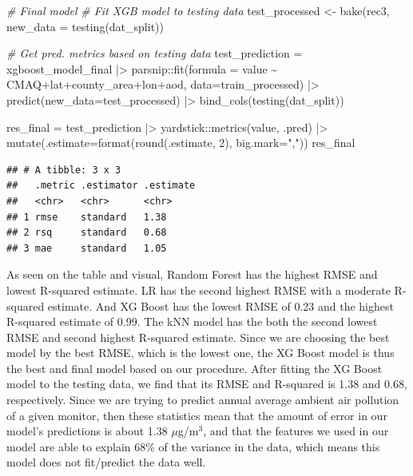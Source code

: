 \documentclass[
]{article}
\newenvironment{Shaded}{\begin{snugshade}}{\end{snugshade}}
\newcommand{\AttributeTok}[1]{\textcolor[rgb]{0.77,0.63,0.00}{#1}}
\newcommand{\CommentTok}[1]{\textcolor[rgb]{0.56,0.35,0.01}{\textit{#1}}}
\newcommand{\DecValTok}[1]{\textcolor[rgb]{0.00,0.00,0.81}{#1}}
\newcommand{\FunctionTok}[1]{\textcolor[rgb]{0.00,0.00,0.00}{#1}}
\newcommand{\NormalTok}[1]{#1}
\newcommand{\OtherTok}[1]{\textcolor[rgb]{0.56,0.35,0.01}{#1}}
\newcommand{\SpecialCharTok}[1]{\textcolor[rgb]{0.00,0.00,0.00}{#1}}
\newcommand{\StringTok}[1]{\textcolor[rgb]{0.31,0.60,0.02}{#1}}
\begin{document}
\begin{Shaded}
\begin{Highlighting}[]
\CommentTok{\# Final model}
\CommentTok{\# Fit XGB model to testing data}
\NormalTok{test\_processed }\OtherTok{\textless{}{-}} \FunctionTok{bake}\NormalTok{(rec3, }\AttributeTok{new\_data =} \FunctionTok{testing}\NormalTok{(dat\_split))}

\CommentTok{\# Get pred. metrics based on testing data}
\NormalTok{test\_prediction }\OtherTok{=}\NormalTok{ xgboost\_model\_final }\SpecialCharTok{|\textgreater{}} 
\NormalTok{  parsnip}\SpecialCharTok{::}\FunctionTok{fit}\NormalTok{(}\AttributeTok{formula =}\NormalTok{ value }\SpecialCharTok{\textasciitilde{}}\NormalTok{ CMAQ}\SpecialCharTok{+}\NormalTok{lat}\SpecialCharTok{+}\NormalTok{county\_area}\SpecialCharTok{+}\NormalTok{lon}\SpecialCharTok{+}\NormalTok{aod, }\AttributeTok{data=}\NormalTok{train\_processed) }\SpecialCharTok{|\textgreater{}} 
  \FunctionTok{predict}\NormalTok{(}\AttributeTok{new\_data=}\NormalTok{test\_processed) }\SpecialCharTok{|\textgreater{}} 
  \FunctionTok{bind\_cols}\NormalTok{(}\FunctionTok{testing}\NormalTok{(dat\_split))}

\NormalTok{res\_final }\OtherTok{=}\NormalTok{ test\_prediction }\SpecialCharTok{|\textgreater{}} 
\NormalTok{  yardstick}\SpecialCharTok{::}\FunctionTok{metrics}\NormalTok{(value, .pred) }\SpecialCharTok{|\textgreater{}} 
  \FunctionTok{mutate}\NormalTok{(}\AttributeTok{.estimate=}\FunctionTok{format}\NormalTok{(}\FunctionTok{round}\NormalTok{(.estimate, }\DecValTok{2}\NormalTok{), }\AttributeTok{big.mark=}\StringTok{","}\NormalTok{))}
\NormalTok{res\_final}
\end{Highlighting}
\end{Shaded}

\begin{verbatim}
## # A tibble: 3 x 3
##   .metric .estimator .estimate
##   <chr>   <chr>      <chr>    
## 1 rmse    standard   1.38     
## 2 rsq     standard   0.68     
## 3 mae     standard   1.05
\end{verbatim}

As seen on the table and visual, Random Forest has the highest RMSE and
lowest R-squared estimate. LR has the second highest RMSE with a
moderate R-squared estimate. And XG Boost has the lowest RMSE of 0.23
and the highest R-squared estimate of 0.99. The kNN model has the both
the second lowest RMSE and second highest R-squared estimate. Since we
are choosing the best model by the best RMSE, which is the lowest one,
the XG Boost model is thus the best and final model based on our
procedure. After fitting the XG Boost model to the testing data, we find
that its RMSE and R-squared is 1.38 and 0.68, respectively. Since we are
trying to predict annual average ambient air pollution of a given
monitor, then these statistics mean that the amount of error in our
model's predictions is about 1.38 \(\mu\)g/m\(^3\), and that the
features we used in our model are able to explain 68\% of the variance
in the data, which means this model does not fit/predict the data well.
\end{document}
